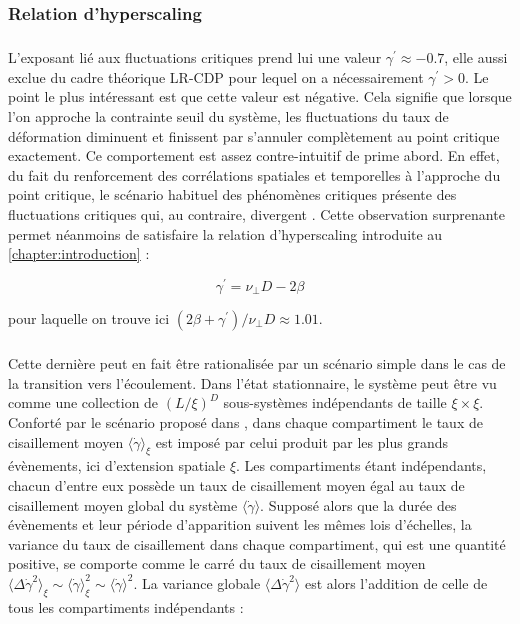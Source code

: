 \subsubsection{Relation d'hyperscaling}

\subparagraph{}L'exposant lié aux fluctuations critiques prend lui une valeur $\gamma^\prime \approx -0.7$, elle aussi exclue du cadre théorique LR-CDP pour lequel on a nécessairement $\gamma^\prime>0$. Le point le plus intéressant est que cette valeur est négative. Cela signifie que lorsque l'on approche la contrainte seuil du système, les fluctuations du taux de déformation diminuent et finissent par s'annuler complètement au point critique exactement. Ce comportement est assez contre-intuitif de prime abord. En effet, du fait du renforcement des corrélations spatiales et temporelles à l'approche du point critique, le scénario habituel des phénomènes critiques présente des fluctuations critiques qui, au contraire, divergent \cite{kardar_statistical_2007}. Cette observation surprenante permet néanmoins de satisfaire la relation d'hyperscaling introduite au \autoref{chapter:introduction} :

\begin{equation}
	\gamma^\prime = \nu_\perp D - 2\beta
	\label{eq:hyperscalingEPM}
\end{equation}

\noindent pour laquelle on trouve ici $(2\beta + \gamma^\prime) / \nu_\perp D\approx 1.01$.  

\subparagraph{}Cette dernière peut en fait être rationalisée par un scénario simple dans le cas de la transition vers l'écoulement. Dans l'état stationnaire, le système peut être vu comme une collection de $(L/\xi)^D$ sous-systèmes indépendants de taille $\xi \times \xi$. Conforté par le scénario proposé dans \cite{lin_scaling_2014}, dans chaque compartiment le taux de cisaillement moyen $\langle\dot{\gamma}\rangle_\xi$ est imposé par celui produit par les plus grands évènements, ici d'extension spatiale $\xi$. Les compartiments étant indépendants, chacun d'entre eux possède un taux de cisaillement moyen égal au taux de cisaillement moyen global du système $\langle \dot{\gamma} \rangle$. Supposé alors que la durée des évènements et leur période d'apparition suivent les mêmes lois d'échelles, la variance du taux de cisaillement dans chaque compartiment, qui est une quantité positive, se comporte comme le carré du taux de cisaillement moyen $\langle \Delta\dot{\gamma}^2 \rangle_\xi \sim \langle\dot{\gamma}\rangle_\xi^2 \sim \langle\dot{\gamma}\rangle^2$. La variance globale $\langle \Delta\dot{\gamma}^2 \rangle$ est alors l'addition de celle de tous les compartiments indépendants :

